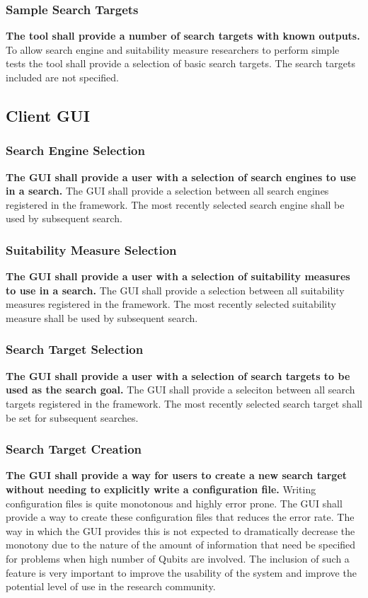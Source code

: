 \subsubsection{Sample Search Targets}
\textbf{The tool shall provide a number of search targets with known outputs.}
To allow search engine and suitability measure researchers to perform simple tests the tool shall provide a selection of basic search targets.
The search targets included are not specified.

\subsection{Client GUI}
\subsubsection{Search Engine Selection}
\textbf{The GUI shall provide a user with a selection of search engines to use in a search.}
The GUI shall provide a selection between all search engines registered in the framework.
The most recently selected search engine shall be used by subsequent search.

\subsubsection{Suitability Measure Selection}
\textbf{The GUI shall provide a user with a selection of suitability measures to use in a search.}
The GUI shall provide a selection between all suitability measures registered in the framework.
The most recently selected suitability measure shall be used by subsequent search.

\subsubsection{Search Target Selection}
\textbf{The GUI shall provide a user with a selection of search targets to be used as the search goal.}
The GUI shall provide a seleciton between all search targets registered in the framework.
The most recently selected search target shall be set for subsequent searches.

\subsubsection{Search Target Creation}
\textbf{The GUI shall provide a way for users to create a new search target without needing to explicitly write a configuration file.}
Writing configuration files is quite monotonous and highly error prone.
The GUI shall provide a way to create these configuration files that reduces the error rate.
The way in which the GUI provides this is not expected to dramatically decrease the monotony due to the nature of the amount of information that need be specified for problems when high number of Qubits are involved.
The inclusion of such a feature is very important to improve the usability of the system and improve the potential level of use in the research community.

